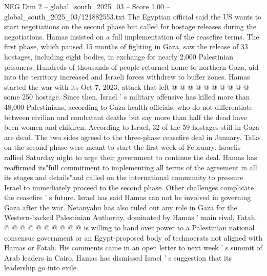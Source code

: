 \begin{textsample}{NEG Dim 2 – global\_south\_2025\_03 – Score 1.00 – global\_south\_2025\_03/121882553.txt}
The Egyptian official said the US wants to start negotiations on the second phase but called for hostage releases during the negotiations.
Hamas insisted on a full implementation of the ceasefire terms.
The first phase, which paused 15 months of fighting in Gaza, saw the release of 33 hostages, including eight bodies, in exchange for nearly 2,000 Palestinian prisoners.
Hundreds of thousands of people returned home to northern Gaza, aid into the territory increased and Israeli forces withdrew to buffer zones.
Hamas started the war with its Oct 7, 2023, attack that left @ @ @ @ @ @ @ @ @ @ some 250 hostage.
Since then, Israel ' s military offensive has killed more than 48,000 Palestinians, according to Gaza health officials, who do not differentiate between civilian and combatant deaths but say more than half the dead have been women and children.
According to Israel, 32 of the 59 hostages still in Gaza are dead.
The two sides agreed to the three-phase ceasefire deal in January.
Talks on the second phase were meant to start the first week of February.
Israelis rallied Saturday night to urge their government to continue the deal.
Hamas has reaffirmed its"full commitment to implementing all terms of the agreement in all its stages and details"and called on the international community to pressure Israel to immediately proceed to the second phase.
Other challenges complicate the ceasefire ' s future.
Israel has said Hamas can not be involved in governing Gaza after the war.
Netanyahu has also ruled out any role in Gaza for the Western-backed Palestinian Authority, dominated by Hamas ' main rival, Fatah. @ @ @ @ @ @ @ @ @ @ is willing to hand over power to a Palestinian national consensus government or an Egypt-proposed body of technocrats not aligned with Hamas or Fatah.
His comments came in an open letter to next week ' s summit of Arab leaders in Cairo.
Hamas has dismissed Israel ' s suggestion that its leadership go into exile.

\end{textsample}
